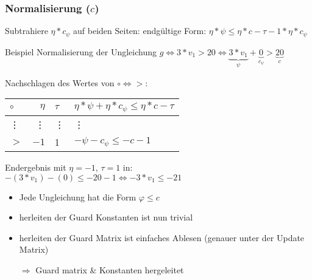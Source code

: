 \begin{frame} %
	\frametitle{Normalisierung ($c$)}
	Subtrahiere $\eta*c_\psi$ auf beiden Seiten: \newline
	endg\"ultige Form:  $\eta*\psi \le \eta*c -\tau -1*\eta*c_{\psi}$
	
	\begin{exampleblock}{Beispiel}
		Normalisierung der Ungleichung $g \Leftrightarrow 3*v_1>20 \Leftrightarrow \underbrace{3*v_1}_{\psi}+\underbrace{0}_{c_\psi} > \underbrace{20}_{c}$\newline
		
		Nachschlagen des Wertes von $\circ \Leftrightarrow >$: 
		\hspace*{1.5cm}
		\begin{tabular}{|l|r|l|l|}
			\hline
			$\circ$ 	& $\eta$ 	& $\tau$ 	&  $ \eta*\psi + \eta*c_{\psi} \le \eta*c-\tau$ \\ 
			\hline \hline
			\vdots 		& \vdots 	&  \vdots 		& \vdots \\ \hline
			$>$ 		& $-1$		&  1 		& $-\psi - c_{\psi} \le -c -1 $ \\ \hline
		\end{tabular} \newline
	
		Endergebnis mit $\eta=-1$, $\tau = 1$ in: \newline
		\hspace*{1.5cm}$-(3*v_1)-(0)\le-20-1 \Leftrightarrow -3*v_1 \le -21$
	\end{exampleblock}
\end{frame}

\begin{frame} %
	\begin{itemize}
		\item Jede Ungleichung hat die Form $\varphi \le c$
		\item herleiten der Guard Konstanten ist nun trivial
		\item herleiten der Guard Matrix ist einfaches Ablesen
		\hspace*{1.5cm}(genauer unter der Update Matrix)
		\item[$\Rightarrow$] Guard matrix \& Konstanten hergeleitet \checkmark
	\end{itemize}
\end{frame}

